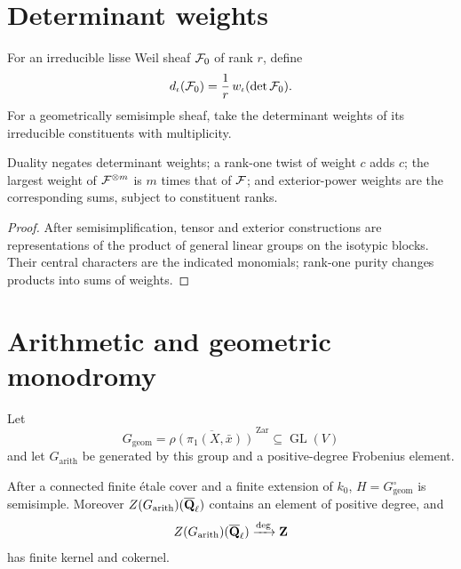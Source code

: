 \section{Determinant weights}

\begin{definition}
\label{def:determinant-weight}
For an irreducible lisse Weil sheaf \(\mathcal F_0\) of rank \(r\), define
\[
 d_\iota(\mathcal F_0)=\frac1r\,w_\iota(\det\mathcal F_0).
\]
For a geometrically semisimple sheaf, take the determinant weights of
its irreducible constituents with multiplicity.
\end{definition}

\begin{lemma}
\label{lem:det-weight-arithmetic}
Duality negates determinant weights; a rank-one twist of weight \(c\)
adds \(c\); the largest weight of \(\mathcal F^{\otimes m}\) is \(m\) times
that of \(\mathcal F\); and exterior-power weights are the corresponding sums,
subject to constituent ranks.
\end{lemma}

\begin{proof}
After semisimplification, tensor and exterior constructions are
representations of the product of general linear groups on the
isotypic blocks.  Their central characters are the indicated monomials;
rank-one purity changes products into sums of weights.
\end{proof}

\section{Arithmetic and geometric monodromy}

Let
\[
 G_{\mathrm{geom}}
 =\overline{\rho(\pi_1(X,\bar x))}^{\,\mathrm{Zar}}
 \subseteq\operatorname{GL}(V)
\]
and let \(G_{\mathrm{arith}}\) be generated by this group and a
positive-degree Frobenius element.

\begin{proposition}
\label{prop:positive-degree-center}
After a connected finite \'etale cover and a finite extension of
\(k_0\), \(H=G_{\mathrm{geom}}^\circ\) is semisimple.  Moreover
\(Z(G_{\mathrm{arith}})(\overline{\mathbf Q}_\ell)\) contains an element of positive
degree, and
\[
 Z(G_{\mathrm{arith}})(\overline{\mathbf Q}_\ell)\xrightarrow{\deg}\mathbf Z
\]
has finite kernel and cokernel.
\end{proposition}

